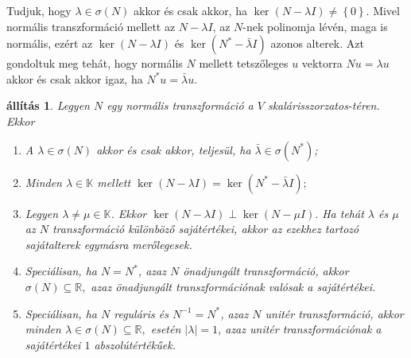 \documentclass[a4paper, showtrims]{memoir}
\theoremstyle{plain}
\newtheorem{proposition}{állítás}[chapter]
\theoremstyle{remark}
\theoremstyle{definition}
\begin{document}
Tudjuk, hogy $\lambda\in\sigma(N)$ akkor és csak akkor, ha $\ker(N-\lambda I)\neq \left\{ 0 \right\}$.
Mivel normális transzformáció mellett az $N-\lambda I$,
az $N$-nek polinomja lévén,
maga is normális,
ezért az $\ker (N-\lambda I)$ és $\ker (N^\ast-\bar{\lambda}I)$ azonos alterek.
Azt gondoltuk meg tehát, hogy normális $N$ mellett
tetszőleges $u$ vektorra $Nu=\lambda u$ akkor és csak akkor igaz, ha $N^\ast u=\bar{\lambda}u$.
\begin{proposition}\label{pr:normtul}
	Legyen $N$ egy normális transzformáció a $V$ skalárisszorzatos-téren.
	Ekkor
	\begin{enumerate}
		\item
		      A $\lambda\in\sigma\left( N \right)$ akkor és csak akkor,
		      teljesül, ha
		      $\bar{\lambda}\in\sigma\left( N^\ast \right)$;
		\item
		      Minden $\lambda\in\mathbb{K}$ mellett
		      \begin{math}
			      \ker (N-\lambda I)=\ker (N^\ast-\bar{\lambda}I);
		      \end{math}
		\item
              Legyen $\lambda\neq \mu\in\mathbb{K}$. Ekkor 
		      \begin{math}
			      \ker \left( N-\lambda I \right)\perp\ker\left( N-\mu I \right).
		      \end{math}
              Ha tehát $\lambda$ és $\mu$ az $N$ transzformáció különböző sajátértékei, 
              akkor az ezekhez tartozó sajátalterek egymásra merőlegesek.
		\item Speciálisan, ha $N=N^\ast$, azaz $N$ önadjungált transzformáció, akkor
		      \begin{math}
			      \sigma\left( N \right)\subseteq \mathbb{R},
		      \end{math}
		      azaz önadjungált transzformációnak valósak a sajátértékei.
        \item Speciálisan, ha $N$ reguláris és $N^{-1}=N^\ast$, azaz $N$ unitér transzformáció, akkor
              minden 
		      \begin{math}
			      \lambda\in\sigma\left( N \right)\subseteq \mathbb{R},
		      \end{math}
              esetén $|\lambda|=1$, 
		      azaz unitér transzformációnak a sajátértékei $1$ abszolútértékűek.
		      \qedhere
	\end{enumerate}
\end{proposition}
\end{document}
